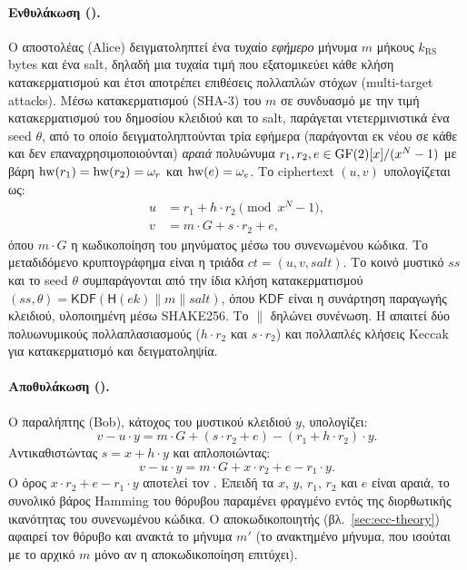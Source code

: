 \paragraph{Ενθυλάκωση (\Encaps).}
Ο αποστολέας (Alice) δειγματοληπτεί ένα τυχαίο \emph{εφήμερο} μήνυμα 
$m$ μήκους $k_{\mathrm{RS}}$ bytes και ένα salt, δηλαδή μια τυχαία τιμή που εξατομικεύει κάθε κλήση 
κατακερματισμού και έτσι αποτρέπει επιθέσεις πολλαπλών στόχων (multi-target attacks).
Μέσω κατακερματισμού (SHA-3) του $m$ σε συνδυασμό με την τιμή κατακερματισμού του δημοσίου κλειδιού
και το salt, παράγεται ντετερμινιστικά ένα seed $\theta$, από το οποίο
δειγματοληπτούνται τρία εφήμερα (παράγονται εκ νέου σε κάθε \Encaps και δεν επαναχρησιμοποιούνται) \emph{αραιά} πολυώνυμα $r_1, r_2, e \in \mathrm{GF}(2)[x]/(x^{N}-1)$
με βάρη $\operatorname{hw}(r_1) = \operatorname{hw}(r_2) = \omega_r$ και $\operatorname{hw}(e) = \omega_e$.
Το ciphertext $(u, v)$ υπολογίζεται ως:
\begin{align}
  u &= r_1 + h \cdot r_2 \pmod{x^N - 1}, \\
  v &= m \cdot G + s \cdot r_2 + e,
\end{align}
όπου $m \cdot G$ η κωδικοποίηση του μηνύματος μέσω του συνενωμένου κώδικα.
Το μεταδιδόμενο κρυπτογράφημα είναι η τριάδα $ct = (u, v, \mathit{salt})$.
Το κοινό μυστικό $ss$ και το seed $\theta$ συμπαράγονται από την ίδια κλήση κατακερματισμού $(ss, \theta) = \mathsf{KDF}(\mathsf{H}(ek) \| m \| \mathit{salt})$, όπου $\mathsf{KDF}$ είναι η συνάρτηση παραγωγής κλειδιού, υλοποιημένη μέσω SHAKE256. Το $\|$ δηλώνει συνένωση.
Η \Encaps απαιτεί δύο πολυωνυμικούς πολλαπλασιασμούς ($h \cdot r_2$ και
$s \cdot r_2$) και πολλαπλές κλήσεις Keccak για κατακερματισμό και δειγματοληψία.

\paragraph{Αποθυλάκωση (\Decaps).}
Ο παραλήπτης (Bob), κάτοχος του μυστικού κλειδιού $y$, υπολογίζει:
\begin{equation}
  v - u \cdot y = m \cdot G + (s \cdot r_2 + e) - (r_1 + h \cdot r_2) \cdot y.
\end{equation}
Αντικαθιστώντας $s = x + h \cdot y$ και απλοποιώντας:
\begin{equation}
  v - u \cdot y = m \cdot G + x \cdot r_2 + e - r_1 \cdot y.
\end{equation}
Ο όρος $x \cdot r_2 + e - r_1 \cdot y$ αποτελεί τον .
Επειδή τα $x$, $y$, $r_1$, $r_2$ και $e$ είναι αραιά, το συνολικό βάρος Hamming
του θόρυβου παραμένει φραγμένο εντός της διορθωτικής ικανότητας του συνενωμένου
κώδικα.
Ο αποκωδικοποιητής (βλ.\ \cref{sec:ecc-theory}) αφαιρεί τον θόρυβο και ανακτά το μήνυμα $m'$ (το ανακτημένο μήνυμα, που ισούται με το αρχικό $m$ μόνο αν η αποκωδικοποίηση επιτύχει).

